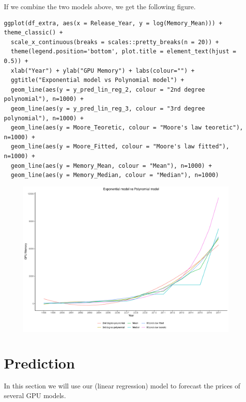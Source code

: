 \documentclass[a4paper]{article}
\begin{document}
If we combine the two models above, we get the following figure.
\begin{mdframed}[leftline=false,rightline=false,backgroundcolor=lightblue!10,nobreak=false]
    \begin{verbatim}
ggplot(df_extra, aes(x = Release_Year, y = log(Memory_Mean))) +  theme_classic() +
  scale_x_continuous(breaks = scales::pretty_breaks(n = 20)) +
  theme(legend.position='bottom', plot.title = element_text(hjust = 0.5)) +
  xlab("Year") + ylab("GPU Memory") + labs(colour="") + 
  ggtitle("Exponential model vs Polynomial model") + 
  geom_line(aes(y = y_pred_lin_reg_2, colour = "2nd degree polynomial"), n=1000) + 
  geom_line(aes(y = y_pred_lin_reg_3, colour = "3rd degree polynomial"), n=1000) +
  geom_line(aes(y = Moore_Teoretic, colour = "Moore's law teoretic"), n=1000) +
  geom_line(aes(y = Moore_Fitted, colour = "Moore's law fitted"), n=1000) +
  geom_line(aes(y = Memory_Mean, colour = "Mean"), n=1000) + 
  geom_line(aes(y = Memory_Median, colour = "Median"), n=1000) 
    \end{verbatim}
\end{mdframed}
\begin{figure}[H]
    \centering
    \includegraphics[keepaspectratio, width=1\textwidth, height=1\textheight]{EM/exp_poly.pdf}
\end{figure}

\section{Prediction}
In this section we will use our (linear regression) model to forecast the prices of several GPU models.
\end{document}
